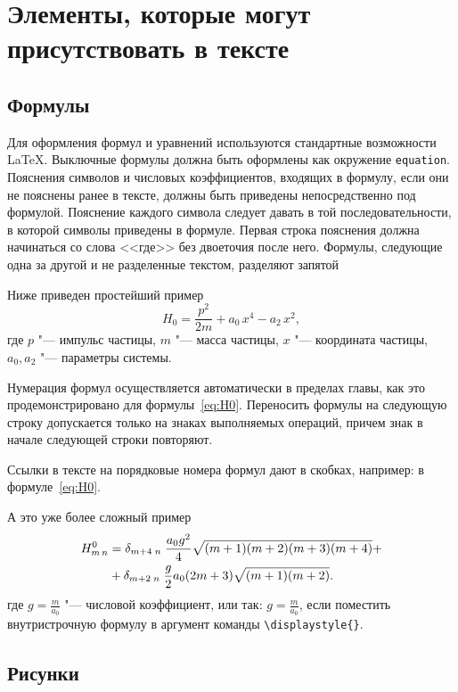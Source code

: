 \chapter{Элементы, которые могут присутствовать в тексте}

\section{Формулы}

Для оформления формул и уравнений используются стандартные возможности \LaTeX.
Выключные формулы должна быть оформлены как окружение \verb|equation|.
Пояснения символов и числовых коэффициентов, входящих в формулу, если они не
пояснены ранее в тексте, должны быть приведены непосредственно под формулой.
Пояснение каждого символа следует давать в той последовательности, в которой
символы приведены в формуле. Первая строка пояснения должна начинаться
со слова  <<где>> без двоеточия после него. Формулы, следующие одна за другой
и не разделенные текстом, разделяют запятой

Ниже приведен простейший пример
\begin{equation}\label{eq:H0}
H_0 = \frac{p^2}{2 m} + a_0\, x^4 - a_2\, x^2,
\end{equation}
где  $p$ "--- импульс частицы, $m$ "--- масса частицы, $x$ "--- координата
частицы, $a_0, a_2$ "--- параметры системы.

Нумерация формул осуществляется автоматически в пределах главы, как это
продемонстрировано для формулы~\eqref{eq:H0}. Переносить формулы на следующую
строку допускается только на знаках выполняемых операций, причем знак в начале
следующей строки повторяют. 

Ссылки в тексте на порядковые номера формул дают в скобках, например:
в формуле~\eqref{eq:H0}.

А это уже более сложный пример
\begin{align}
H^0_{m\, n} & = \delta_{m + 4 \; n} \;
\frac{a_0 g^2}{4} \sqrt{(m + 1)(m + 2)(m + 3)(m + 4)} +\notag\\
& + \delta_{m + 2 \; n} \;
\frac{g}{2} a_0  (2 m + 3) \sqrt{(m + 1)(m  + 2)}.\label{eq:Hmn}
\end{align}
где $g = \frac{m}{a_0}$ "--- числовой коэффициент, или так:
$\displaystyle{g = \frac{m}{a_0}}$, если поместить внутристрочную формулу
в аргумент команды \verb|\displaystyle{}|.



\section{Рисунки}

